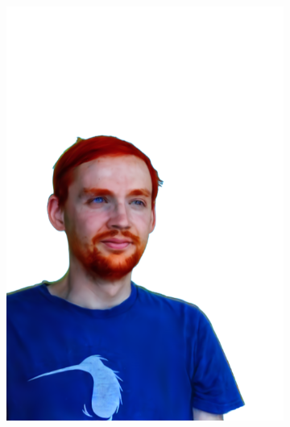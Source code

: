 \begin{figure}[ht]
\begin{subfigure}{0.08\linewidth}
        \includegraphics[width=\textwidth]{Figures/results/low/simon_red/11_render.png}
	\end{subfigure}
	\begin{subfigure}{0.08\linewidth}%

\end{subfigure}
\end{figure}
